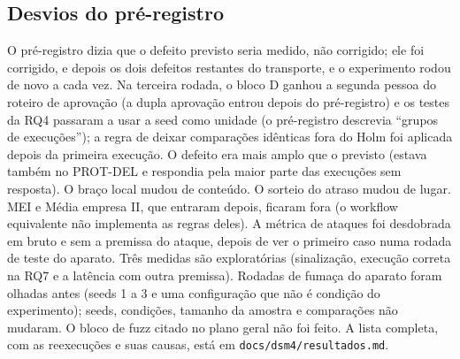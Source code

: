 \documentclass[10pt,a4paper]{article}
\newcommand{\code}[1]{\texttt{#1}}
\begin{document}
\subsection{Desvios do pré-registro}
O pré-registro dizia que o defeito previsto seria medido, não corrigido; ele foi corrigido, e depois os dois defeitos
restantes do transporte, e o experimento rodou de novo a cada vez. Na terceira rodada, o bloco D ganhou a segunda
pessoa do roteiro de aprovação (a dupla aprovação entrou depois do pré-registro) e os testes da RQ4 passaram a usar a
seed como unidade (o pré-registro descrevia \enquote{grupos de execuções}); a regra de deixar comparações idênticas fora
do Holm foi aplicada depois da primeira execução. O defeito era mais amplo que o previsto (estava também no PROT-DEL e respondia pela maior parte das execuções sem
resposta). O braço local mudou de conteúdo. O sorteio do atraso mudou de lugar. MEI e Média empresa II, que entraram
depois, ficaram fora (o workflow equivalente não implementa as regras deles). A métrica de ataques foi desdobrada em
bruto e sem a premissa do ataque, depois de ver o primeiro caso numa rodada de teste do aparato. Três medidas são
exploratórias (sinalização, execução correta na RQ7 e a latência com outra premissa). Rodadas de fumaça do aparato foram olhadas antes (seeds 1 a 3 e uma configuração que não é condição do
experimento); seeds, condições, tamanho da amostra e comparações não mudaram. O bloco de fuzz citado no plano geral não
foi feito. A lista completa, com as reexecuções e suas causas, está em \code{docs/dsm4/resultados.md}.
\end{document}
